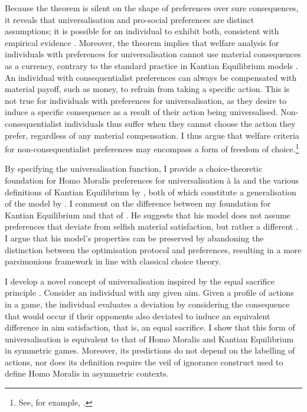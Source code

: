 Because the theorem is silent on the shape of preferences over sure consequences, it reveals that universalisation and pro-social preferences are distinct assumptions; it is possible for an individual to exhibit both, consistent with empirical evidence \citep{vanleeuwenEstimatingSocialPreferences2024}. Moreover, the theorem implies that welfare analysis for individuals with preferences for universalisation cannot use material consequences as a currency, contrary to the standard practice in Kantian Equilibrium models \citep{roemer2019cooperate}. An individual with consequentialist preferences can always be compensated with material payoff, such as money, to refrain from taking a specific action. This is not true for individuals with preferences for universalisation, as they desire to induce a specific consequence as a result of their action being universalised. Non-consequentialist individuals thus suffer when they cannot choose the action they prefer, regardless of any material compensation. I thus argue that welfare criteria for non-consequentialist preferences may encompass a form of freedom of choice.\footnote{See, for example, \citet[Ch. 10]{fleurbaey2008fairness}.}

By specifying the universalisation function, I provide a choice-theoretic foundation for Homo Moralis preferences for universalisation à la \cite{algerHomoMoralisPreference2013} and the various definitions of Kantian Equilibrium by \cite{roemer2019cooperate}, both of which constitute a generalisation of the model by \cite{laffontMacroeconomicConstraintsEconomic1975}. I comment on the difference between my foundation for Kantian Equilibrium and that of \citeauthor{roemer2019cooperate}. He suggests that his model does not assume preferences that deviate from selfish material satisfaction, but rather a different . I argue that his model's properties can be preserved by abandoning the distinction between the optimisation protocol and preferences, resulting in a more parsimonious framework in line with classical choice theory.

I develop a novel concept of universalisation inspired by the equal sacrifice principle \citep{mill1885principles,youngDistributiveJusticeTaxation1988}. Consider an individual with any given aim. Given a profile of actions in a game, the individual evaluates a deviation by considering the consequence that would occur if their opponents also deviated to induce an equivalent difference in aim satisfaction, that is, an equal sacrifice. I show that this form of universalisation is equivalent to that of Homo Moralis and Kantian Equilibrium in symmetric games. Moreover, its predictions do not depend on the labelling of actions, nor does its definition require the veil of ignorance construct used to define Homo Moralis in asymmetric contexts.

